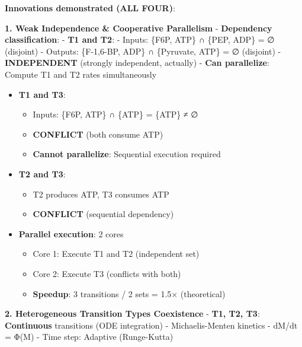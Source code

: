 \textbf{Innovations demonstrated (ALL FOUR)}:

\textbf{1. Weak Independence \& Cooperative Parallelism} \checkmark -
\textbf{Dependency classification}: - \textbf{T1 and T2}: - Inputs:
\{F6P, ATP\} ∩ \{PEP, ADP\} = ∅ (disjoint) - Outputs: \{F-1,6-BP, ADP\}
∩ \{Pyruvate, ATP\} = ∅ (disjoint) - \textbf{INDEPENDENT} (strongly
independent, actually) - \textbf{Can parallelize}: Compute T1 and T2
rates simultaneously

\begin{itemize}
\tightlist
\item
  \textbf{T1 and T3}:

  \begin{itemize}
  \tightlist
  \item
    Inputs: \{F6P, ATP\} ∩ \{ATP\} = \{ATP\} ≠ ∅
  \item
    \textbf{CONFLICT} (both consume ATP)
  \item
    \textbf{Cannot parallelize}: Sequential execution required
  \end{itemize}
\item
  \textbf{T2 and T3}:

  \begin{itemize}
  \tightlist
  \item
    T2 produces ATP, T3 consumes ATP
  \item
    \textbf{CONFLICT} (sequential dependency)
  \end{itemize}
\item
  \textbf{Parallel execution}: 2 cores

  \begin{itemize}
  \tightlist
  \item
    Core 1: Execute T1 and T2 (independent set)
  \item
    Core 2: Execute T3 (conflicts with both)
  \item
    \textbf{Speedup}: 3 transitions / 2 sets = 1.5× (theoretical)
  \end{itemize}
\end{itemize}

\textbf{2. Heterogeneous Transition Types Coexistence} \checkmark - \textbf{T1,
T2, T3}: \textbf{Continuous} transitions (ODE integration) -
Michaelis-Menten kinetics - dM/dt = Φ(M) - Time step: Adaptive
(Runge-Kutta)

